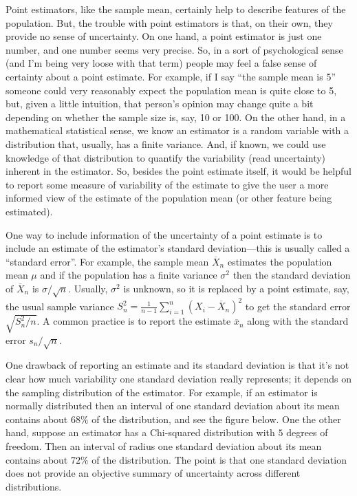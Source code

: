 \documentclass[
]{book}
\begin{document}
Point estimators, like the sample mean, certainly help to describe features of the population. But, the trouble with point estimators is that, on their own, they provide no sense of uncertainty. On one hand, a point estimator is just one number, and one number seems very precise. So, in a sort of psychological sense (and I'm being very loose with that term) people may feel a false sense of certainty about a point estimate. For example, if I say ``the sample mean is 5'' someone could very reasonably expect the population mean is quite close to 5, but, given a little intuition, that person's opinion may change quite a bit depending on whether the sample size is, say, 10 or 100. On the other hand, in a mathematical statistical sense, we know an estimator is a random variable with a distribution that, usually, has a finite variance. And, if known, we could use knowledge of that distribution to quantify the variability (read uncertainty) inherent in the estimator. So, besides the point estimate itself, it would be helpful to report some measure of variability of the estimate to give the user a more informed view of the estimate of the population mean (or other feature being estimated).

One way to include information of the uncertainty of a point estimate is to include an estimate of the estimator's standard deviation---this is usually called a ``standard error''. For example, the sample mean \(\overline X_n\) estimates the population mean \(\mu\) and if the population has a finite variance \(\sigma^2\) then the standard deviation of \(\overline X_n\) is \(\sigma/\sqrt{n}\). Usually, \(\sigma^2\) is unknown, so it is replaced by a point estimate, say, the usual sample variance \(S_n^2 = \frac{1}{n-1}\sum_{i=1}^n (X_i - \overline X_n)^2\) to get the standard error \(\sqrt{S_n^2/n}\). A common practice is to report the estimate \(\overline x_n\) along with the standard error \(s_n/\sqrt{n}\).

One drawback of reporting an estimate and its standard deviation is that it's not clear how much variability one standard deviation really represents; it depends on the sampling distribution of the estimator. For example, if an estimator is normally distributed then an interval of one standard deviation about its mean contains about \(68\%\) of the distribution, and see the figure below. One the other hand, suppose an estimator has a Chi-squared distribution with \(5\) degrees of freedom. Then an interval of radius one standard deviation about its mean contains about \(72\%\) of the distribution. The point is that one standard deviation does not provide an objective summary of uncertainty across different distributions.
\end{document}
